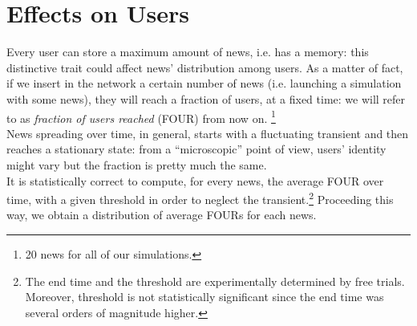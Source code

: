 \section{Effects on Users} \label{sec:users}
Every user can store a maximum amount of news, i.e. has a memory: this
distinctive trait could affect news' distribution among users.
As a matter of fact, if we insert in the network a certain number
of news (i.e. launching a simulation with some news),
they will reach a fraction of users, at a fixed time:
we will refer to as \textit{fraction of users reached} (FOUR)
from now on.
\footnote{20 news for all of our simulations.}\\
News spreading over time, in general, starts with a fluctuating
transient and then reaches a stationary state: from a ``microscopic''
point of view, users' identity might vary but the fraction is
pretty much the same.\\
It is statistically correct to compute, for every news, the average
FOUR over time, with a given threshold in order to
neglect the transient.\footnote{The end time and the threshold are
  experimentally determined by free trials. Moreover, threshold is
  not statistically significant since the end time was several
  orders of magnitude higher.}
Proceeding this way, we obtain a distribution of average FOURs
for each news.\\

